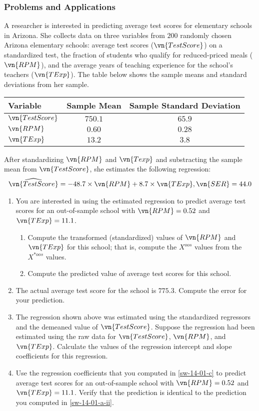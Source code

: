 

\begin{frame}
\frametitle{Problems and Applications}
A researcher is interested in predicting average test scores for elementary schools in Arizona. She collects data on three variables from $200$ randomly chosen Arizona elementary schools: average test scores ($\vn{TestScore}$) on a standardized test, the fraction of students who qualify for reduced-priced meals ($\vn{RPM}$), and the average years of teaching experience for the school's teachers ($\vn{TExp}$). The table below shows the sample means and standard deviations from her sample.
\begin{center}
\begin{tabular}{lcc}
\toprule
Variable 
    & Sample Mean 
        & Sample Standard Deviation\\
\midrule
$\vn{TestScore}$ 
    & $750.1$ &  $65.9$\\
$\vn{RPM}$ 
    & $0.60$ &  $0.28$\\
$\vn{TExp}$ 
    & $13.2$ &  $3.8$\\
\bottomrule
\end{tabular}
\end{center}
After standardizing $\vn{RPM}$ and $\vn{Texp}$ and substracting the sample mean from $\vn{TestScore}$, she estimates the following regression:
\begin{align*}
\widehat{\vn{TestScore}} = -48.7 \times \vn{RPM} + 8.7 \times \vn{TExp}, \vn{SER} = 44.0
\end{align*}
\begin{enumerate}
\item You are interested in using the estimated regression to predict average test scores for an out-of-sample school with $\vn{RPM}=0.52$ and $\vn{TExp}=11.1$.
\begin{enumerate}
\item Compute the transformed (standardized) values of $\vn{RPM}$ and $\vn{TExp}$ for this school; that is, compute the $X^{oos}$ values from the $X^{*oos}$ values.
\item Compute the predicted value of average test scores for this school.
\label{sw-14-01-a-ii}
\end{enumerate}
\item The actual average test score for the school is $775.3$. Compute the error for your prediction.
\item The regression shown above was estimated using the standardized regressors and the demeaned value of $\vn{TestScore}$. Suppose the regression had been estimated using the raw data for $\vn{TestScore}$, $\vn{RPM}$, and $\vn{TExp}$. Calculate the values of the regression intercept and slope coefficients for this regression.
\label{sw-14-01-c}
\item Use the regression coefficients that you computed in \ref{sw-14-01-c} to predict average test scores for an out-of-sample school with $\vn{RPM}=0.52$ and $\vn{TExp}=11.1$. Verify that the prediction is identical to the prediction you computed in \ref{sw-14-01-a-ii}.
\end{enumerate}
\end{frame}

